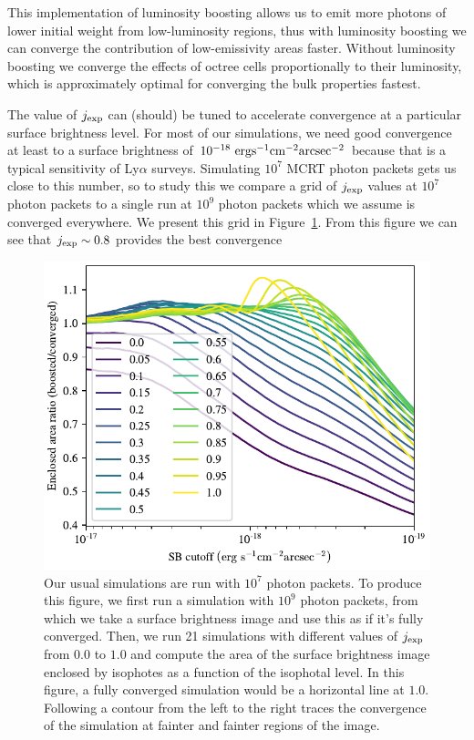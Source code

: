 This implementation of luminosity boosting allows us to emit more photons of lower initial weight from low-luminosity regions, thus with luminosity boosting we can converge the contribution of low-emissivity areas faster.
Without luminosity boosting we converge the effects of octree cells proportionally to their luminosity, which is approximately optimal for converging the bulk properties fastest.

The value of $j_{\rm exp}$ can (should) be tuned to accelerate convergence at a particular surface brightness level.
For most of our simulations, we need good convergence at least to a surface brightness of $10^{-18}\ \rm{erg}\rm{s}^{-1}\rm{cm}^{-2}\rm{arcsec}^{-2}$ because that is a typical sensitivity of Ly$\alpha$ surveys.
Simulating $10^7$ MCRT photon packets gets us close to this number, so to study this we compare a grid of $j_{\rm exp}$ values at $10^7$ photon packets to a single run at $10^9$ photon packets which we assume is converged everywhere.
We present this grid in Figure~\ref{fig:j_exp_profiles}.
From this figure we can see that $j_{\rm exp} \sim 0.8$ provides the best convergence

\begin{figure}[H]
   \centering
   \includegraphics[width=0.9\columnwidth]{figures/profiles.pdf}
    \caption{
        Our usual simulations are run with $10^{7}$ photon packets.
        To produce this figure, we first run a simulation with $10^{9}$ photon packets, from which we take a surface brightness image and use this as if it's fully converged.
        Then, we run 21 simulations with different values of $j_{\rm exp}$ from $0.0$ to $1.0$ and compute the area of the surface brightness image enclosed by isophotes as a function of the isophotal level.
        In this figure, a fully converged simulation would be a horizontal line at $1.0$.
        Following a contour from the left to the right traces the convergence of the simulation at fainter and fainter regions of the image.
    }
   \label{fig:j_exp_profiles}
\end{figure}

